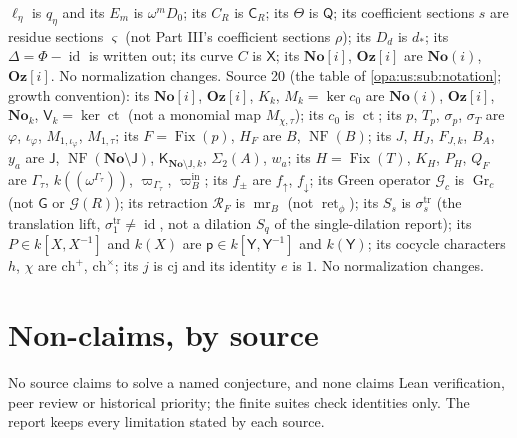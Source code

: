 \documentclass[11pt,oneside]{article}
\numberwithin{equation}{section}
\theoremstyle{definition}
\theoremstyle{remark}
\newcommand{\No}{\mathbf{No}}
\newcommand{\Oz}{\mathbf{Oz}}
\newcommand{\Og}{\mathbf{Oz}[i]}
\newcommand{\SC}{\mathbf{No}(i)}
\newcommand{\ct}{\operatorname{ct}}
\newcommand{\id}{\operatorname{id}}
\newcommand{\Fix}{\operatorname{Fix}}
\newcommand{\gap}{\mathsf G}
\newcommand{\ret}{\operatorname{ret}}
\newcommand{\NF}{\operatorname{NF}}
\begin{document}
$\ell_\eta$ is $q_\eta$ and its $E_m$ is $\omega^mD_0$; its $C_R$ is $\mathsf C_R$; its $\Theta$ is $\mathsf Q$; its coefficient sections $s$ are
residue sections $\varsigma$ (not Part III's coefficient sections $\rho$); its $D_d$ is $d_*$; its $\Delta=\Phi-\id$ is written out; its curve $C$ is
$\mathsf X$; its $\No[i]$, $\Oz[i]$ are $\SC$, $\Og$. No normalization changes.
Source 20 (the table of \cref{opa:us:sub:notation}; growth convention): its $\No[i]$, $\Oz[i]$, $K_k$, $M_k=\ker c_0$ are $\SC$, $\Og$, $\No_k$,
$\mathsf V_k=\ker\ct$ (not a monomial map $M_{\chi,\tau}$); its $c_0$ is $\ct$; its $p$, $T_p$, $\sigma_p$, $\sigma_T$ are $\varphi$, $\iota_\varphi$,
$M_{1,\iota_\varphi}$, $M_{1,\tau}$; its $F=\Fix(p)$, $H_F$ are $B$, $\NF(B)$; its $J$, $H_J$, $F_{J,k}$, $B_A$, $y_a$ are $\mathsf J$,
$\NF(\No\setminus\mathsf J)$, $\mathsf K_{\No\setminus\mathsf J,k}$, $\Sigma_2(A)$, $w_a$; its $H=\Fix(T)$, $K_H$, $P_H$, $Q_F$ are $\Gamma_\tau$,
$k((\omega^{\Gamma_\tau}))$, $\varpi_{\Gamma_\tau}$, $\varpi^{\mathrm{in}}_B$; its $f_\pm$ are $f_\uparrow$, $f_\downarrow$; its Green operator
$\mathcal G_c$ is $\operatorname{Gr}_c$ (not $\gap$ or $\mathcal G(R)$); its retraction $\mathcal R_F$ is $\operatorname{mr}_B$ (not $\ret_\phi$); its
$S_s$ is $\sigma^{\mathrm{tr}}_s$ (the translation lift, $\sigma^{\mathrm{tr}}_1\ne\id$, not a dilation $S_q$ of the single-dilation report); its
$P\in k[X,X^{-1}]$ and $k(X)$ are $\mathsf p\in k[\mathsf Y,\mathsf Y^{-1}]$ and $k(\mathsf Y)$; its cocycle characters $h$, $\chi$ are
$\mathrm{ch}^+$, $\mathrm{ch}^\times$; its $j$ is $\mathrm{cj}$ and its identity $e$ is $1$. No normalization changes.

\section{Non-claims, by source}\label{opa:app:nonclaims}

No source claims to solve a named conjecture, and none claims Lean verification, peer
review or historical priority; the finite suites check identities only. The report
keeps every limitation stated by each source.
\end{document}
